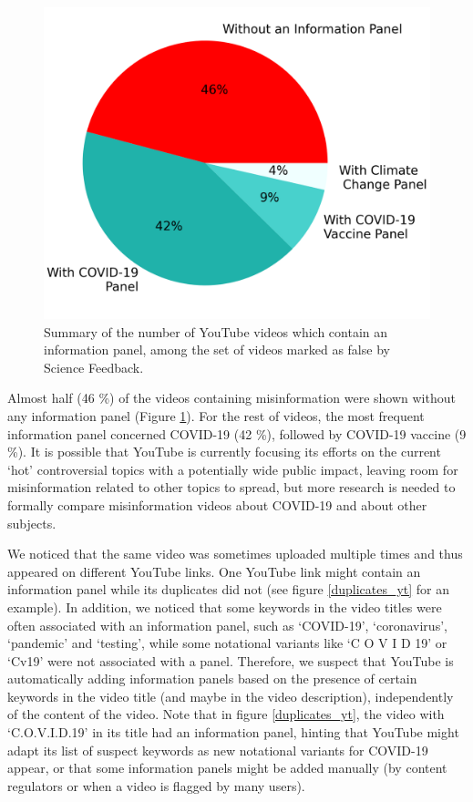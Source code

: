 \documentclass{article}
\begin{document}
\begin{figure}[h]
	\centering
		\includegraphics[scale=0.3]{../figure/youtube_pie_flags.png}
		\caption{Summary of the number of YouTube videos which contain an information panel, among the set of videos marked as false by Science Feedback.}
\label{youtube_panel_proportions}
\end{figure}

\smallskip

Almost half (46 \%) of the videos containing misinformation were shown without any information panel (Figure \ref{youtube_panel_proportions}).
For the rest of videos, the most frequent information panel concerned COVID-19 (42 \%), followed by COVID-19 vaccine (9 \%).
It is possible that YouTube is currently focusing its efforts on the current `hot' controversial topics with a potentially wide public impact, leaving room for misinformation related to other topics to spread, but more research is needed to formally compare misinformation videos about COVID-19 and about other subjects.

\smallskip

We noticed that the same video was sometimes uploaded multiple times and thus appeared on different YouTube links. 
One YouTube link might contain an information panel while its duplicates did not (see figure \ref{duplicates_yt} for an example).  
In addition, we noticed that some keywords in the video titles were often associated with an information panel, such as `COVID-19', `coronavirus', `pandemic' and `testing', while some notational variants like `C O V I D 19' or `Cv19' were not associated with a panel.
Therefore, we suspect that YouTube is automatically adding information panels based on the presence of certain keywords in the video title (and maybe in the video description), independently of the content of the video.
Note that in figure \ref{duplicates_yt}, the video with `C.O.V.I.D.19' in its title had an information panel, hinting that YouTube might adapt its list of suspect keywords as new notational variants for COVID-19 appear, or that some information panels might be added manually (by content regulators or when a video is flagged by many users).
\end{document}
